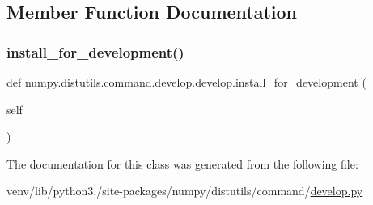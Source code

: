 \subsection{Member Function Documentation}
\mbox{\label{classnumpy_1_1distutils_1_1command_1_1develop_1_1develop_a2b2d904d0a8438debb5ed6ac6be87f1f}} 
\subsubsection{\texorpdfstring{install\+\_\+for\+\_\+development()}{install\_for\_development()}}
{\footnotesize\ttfamily def numpy.\+distutils.\+command.\+develop.\+develop.\+install\+\_\+for\+\_\+development (\begin{DoxyParamCaption}\item[{}]{self }\end{DoxyParamCaption})}



The documentation for this class was generated from the following file\+:\begin{DoxyCompactItemize}
\item 
venv/lib/python3./site-\/packages/numpy/distutils/command/\hyperlink{numpy_2distutils_2command_2develop_8py}{develop.\+py}\end{DoxyCompactItemize}
